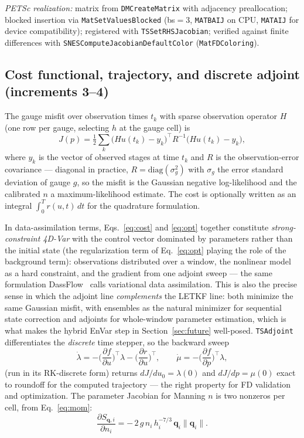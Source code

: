 \documentclass[11pt]{article}
\begin{document}
\emph{PETSc realization:} matrix from \texttt{DMCreateMatrix} with
adjacency preallocation; blocked insertion via
\texttt{MatSetValuesBlocked} (bs$=3$, \texttt{MATBAIJ} on CPU,
\texttt{MATAIJ} for device compatibility); registered with
\texttt{TSSetRHSJacobian}; verified against finite differences with
\texttt{SNESComputeJacobianDefaultColor} (\texttt{MatFDColoring}).

\subsection*{Cost functional, trajectory, and discrete adjoint (increments 3--4)}

The gauge misfit over observation times $t_k$ with sparse observation
operator $H$ (one row per gauge, selecting $h$ at the gauge cell) is
\begin{equation}
  J(p) = \tfrac12 \sum_k
    \big(H u(t_k) - y_k\big)^{\!\top} R^{-1} \big(H u(t_k) - y_k\big),
  \label{eq:cost}
\end{equation}
where $y_k$ is the vector of observed stages at time $t_k$ and $R$ is
the observation-error covariance --- diagonal in practice,
$R = \mathrm{diag}(\sigma_g^2)$ with $\sigma_g$ the error standard
deviation of gauge $g$, so the misfit is the Gaussian negative
log-likelihood and the calibrated $n$ a maximum-likelihood estimate.
The cost is optionally written as an integral $\int_0^T r(u,t)\,dt$ for
the quadrature formulation.

In data-assimilation terms, Eqs.~\eqref{eq:cost} and \eqref{eq:opt}
together constitute \emph{strong-constraint 4D-Var} with the control
vector dominated by parameters rather than the initial state (the
regularization term of Eq.~\eqref{eq:opt} playing the role of the
background term): observations distributed over a window, the nonlinear
model as a hard constraint, and the gradient from one adjoint sweep ---
the same formulation DassFlow~\cite{dassflow} calls variational data
assimilation. This is also the precise sense in which the adjoint line
\emph{complements} the LETKF line: both minimize the same Gaussian
misfit, with ensembles as the natural minimizer for sequential state
correction and adjoints for whole-window parameter estimation, which is
what makes the hybrid EnVar step in Section~\ref{sec:future}
well-posed. \texttt{TSAdjoint} differentiates the
\emph{discrete} time stepper, so the backward sweep
\begin{equation}
  \dot\lambda = -\Big(\frac{\partial f}{\partial u}\Big)^{\!\top}\lambda
                - \Big(\frac{\partial r}{\partial u}\Big)^{\!\top},
  \qquad
  \dot\mu = -\Big(\frac{\partial f}{\partial p}\Big)^{\!\top}\lambda,
  \label{eq:adjoint}
\end{equation}
(run in its RK-discrete form) returns $dJ/du_0 = \lambda(0)$ and
$dJ/dp = \mu(0)$ exact to roundoff for the computed trajectory --- the
right property for FD validation and optimization. The parameter
Jacobian for Manning $n$ is two nonzeros per cell, from
Eq.~\eqref{eq:mom}:
\begin{equation}
  \frac{\partial S_{\mathbf{q},i}}{\partial n_i}
  = -\,2\, g\, n_i\, h_i^{-7/3}\, \mathbf{q}_i \lVert\mathbf{q}_i\rVert .
  \label{eq:dSdn}
\end{equation}
\end{document}
